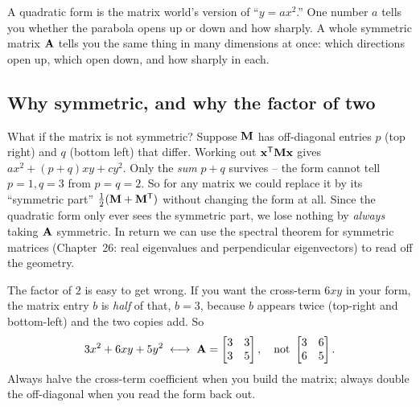 \begin{focusbox}
A quadratic form is the matrix world's version of ``$y = a x^2$.'' One number $a$
tells you whether the parabola opens up or down and how sharply. A whole symmetric
matrix $\mathbf{A}$ tells you the same thing in many dimensions at once: which
directions open up, which open down, and how sharply in each.
\end{focusbox}

\subsection{Why symmetric, and why the factor of two}

What if the matrix is not symmetric? Suppose $\mathbf{M}$ has
off-diagonal entries $p$ (top right) and $q$ (bottom left) that differ. Working out
$\mathbf{x}^{\mathsf{T}}\mathbf{M}\mathbf{x}$ gives $a x^2 + (p+q)xy + c y^2$. Only the \emph{sum} $p+q$
survives -- the form cannot tell $p=1,q=3$ from $p=q=2$. So for any matrix we could
replace it by its ``symmetric part'' $\tfrac12(\mathbf{M}+\mathbf{M}^{\mathsf{T}})$ without changing
the form at all. Since the quadratic form only ever sees the symmetric part, we lose
nothing by \emph{always} taking $\mathbf{A}$ symmetric. In return we can use the spectral
theorem for symmetric matrices (Chapter~26: real eigenvalues and perpendicular
eigenvectors) to read off the geometry.

\begin{trapbox}
The factor of $2$ is easy to get wrong. If you want the cross-term $6xy$ in your
form, the matrix entry $b$ is \emph{half} of that, $b=3$, because $b$ appears twice
(top-right and bottom-left) and the two copies add. So
\[
  3x^2 + 6xy + 5y^2 \;\longleftrightarrow\; \mathbf{A}=\begin{bmatrix}3 & 3\\ 3 & 5\end{bmatrix},
  \quad\text{not } \begin{bmatrix}3&6\\6&5\end{bmatrix}.
\]
Always halve the cross-term coefficient when you build the matrix; always double the
off-diagonal when you read the form back out.
\end{trapbox}

